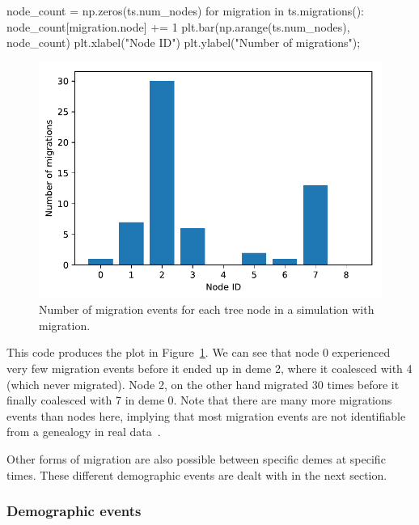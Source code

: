 \documentclass[graybox]{svmult}
\begin{document}
\begin{pythoncode}
node_count = np.zeros(ts.num_nodes)
for migration in ts.migrations():
    node_count[migration.node] += 1
plt.bar(np.arange(ts.num_nodes), node_count)
plt.xlabel("Node ID")
plt.ylabel("Number of migrations");
\end{pythoncode}

\begin{figure}[t]
\begin{center}
\includegraphics[width=\textwidth]{images/plot_5.pdf}
\end{center}
\caption{\label{fig:migration_counts} Number of migration events for
each tree node in a simulation with migration.}
\end{figure}

This code produces the plot in Figure~\ref{fig:migration_counts}.
We can see that node 0 experienced very few migration events before it
ended up in deme 2, where it coalesced with 4 (which never migrated).
Node 2, on the other hand migrated 30 times before it finally coalesced
with 7 in deme 0. Note that there are many more migrations events than
nodes here, implying that most migration events are not identifiable
from a genealogy in real data~\citep{sousa2011nonidentifiability}.

Other forms of migration are also possible between specific demes at
specific times. These different demographic events are dealt with in the next section.

\subsubsection{Demographic events}\label{demographic-events}
\end{document}
